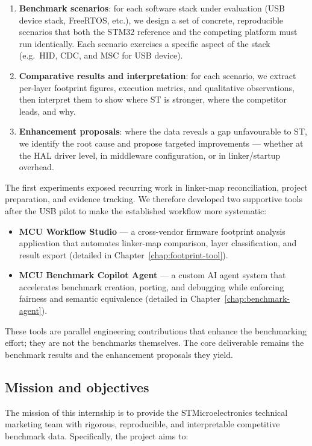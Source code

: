 \begin{enumerate}
\item \textbf{Benchmark scenarios}: for each software stack under evaluation (USB device
stack, FreeRTOS, etc.), we design a set of concrete, reproducible scenarios that both the
STM32 reference and the competing platform must run identically. Each scenario exercises a
specific aspect of the stack (e.g.\ HID, CDC, and MSC for USB device).
\item \textbf{Comparative results and interpretation}: for each scenario, we extract
per-layer footprint figures, execution metrics, and qualitative observations, then
interpret them to show where ST is stronger, where the competitor leads, and why.
\item \textbf{Enhancement proposals}: where the data reveals a gap unfavourable to ST, we
identify the root cause and propose targeted improvements --- whether at the HAL driver
level, in middleware configuration, or in linker/startup overhead.
\end{enumerate}

The first experiments exposed recurring work in linker-map reconciliation, project
preparation, and evidence tracking. We therefore developed two supportive tools after the
USB pilot to make the established workflow more systematic:

\begin{itemize}
\item \textbf{MCU Workflow Studio} --- a cross-vendor firmware footprint analysis
application that automates linker-map comparison, layer classification, and result export
(detailed in Chapter~\ref{chap:footprint-tool}).
\item \textbf{MCU Benchmark Copilot Agent} --- a custom AI agent system that accelerates
benchmark creation, porting, and debugging while enforcing fairness and semantic
equivalence (detailed in Chapter~\ref{chap:benchmark-agent}).
\end{itemize}

These tools are parallel engineering contributions that enhance the benchmarking effort;
they are not the benchmarks themselves. The core deliverable remains the benchmark results
and the enhancement proposals they yield.

\subsection{Mission and objectives}
\label{sec:objectives}

The mission of this internship is to provide the STMicroelectronics technical marketing
team with rigorous, reproducible, and interpretable competitive benchmark data. Specifically,
the project aims to:

